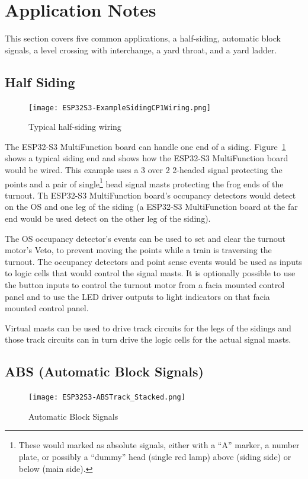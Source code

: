 \clearpage
\section{Application Notes}

This section covers five common applications, a half-siding, automatic block 
signals, a level crossing with interchange, a yard throat, and a yard ladder.

\subsection{Half Siding}
\label{sec:HalfSiding}
\begin{figure}[hbpt]\begin{centering}%
\texttt{[image: ESP32S3-ExampleSidingCP1Wiring.png]}
\caption{Typical half-siding wiring}
\label{fig:ExampleSidingCP1Wiring}
\end{centering}\end{figure}

The ESP32-S3 MultiFunction board can handle one end of a siding.
Figure~\ref{fig:ExampleSidingCP1Wiring} shows a typical siding end and shows
how the ESP32-S3 MultiFunction board would be wired. This example uses a 3
over 2 2-headed signal protecting the points and a pair of
single\footnote{These would marked as absolute signals, either with a ``A''
marker, a number plate, or possibly a ``dummy'' head (single red lamp) above
(siding side) or below (main side).} head signal masts protecting the frog
ends of the turnout. Th ESP32-S3 MultiFunction board's occupancy detectors
would detect on the OS and one leg of the siding (a ESP32-S3 MultiFunction
board at the far end would be used detect on the other leg of the siding).

The OS occupancy detector's events can be used to set and clear the turnout 
motor's Veto, to prevent moving the points while a train is traversing the 
turnout.  The occupancy detectors and point sense events would be used as 
inputs to logic cells that would control the signal masts.  It is optionally 
possible to use the button inputs to control the turnout motor from a facia 
mounted control panel and to use the LED driver outputs to light indicators on 
that facia mounted control panel.

Virtual masts can be used to drive track circuits for the legs of the sidings
and those track circuits can in turn drive the logic cells for the actual
signal masts.

\subsection{ABS (Automatic Block Signals)}
\label{sec:ABS}
\begin{figure}[hbpt]\begin{centering}%
\texttt{[image: ESP32S3-ABSTrack\_Stacked.png]}
\caption{Automatic Block Signals}
\label{fig:ABSTrackStacked}
\end{centering}\end{figure}

